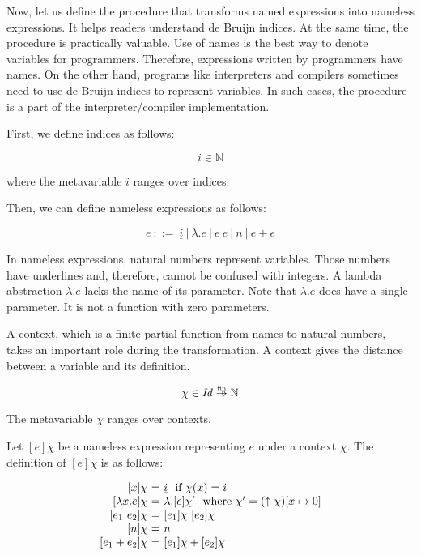 Now, let us define the procedure that transforms named expressions into nameless
expressions. It helps readers understand de Bruijn indices. At the same time, the
procedure is practically valuable. Use of names is the best way to denote
variables for programmers. Therefore, expressions written by programmers have
names. On the other hand, programs like interpreters and compilers sometimes need
to use de Bruijn indices to represent variables. In such cases, the procedure is
a part of the interpreter/compiler implementation.

First, we define indices as follows:

\[ i \in \mathbb{N} \]

where the metavariable $i$ ranges over indices.

Then, we can define nameless expressions as follows:

\[
e\ ::= \ \underline{i}
\ |\ \lambda.e
\ |\ e\ e
\ |\ n
\ |\ e+e
\]

In nameless expressions, natural numbers represent variables. Those numbers have
underlines and, therefore, cannot be confused with integers. A lambda
abstraction $\lambda.e$ lacks the name of its parameter. Note that
$\lambda.e$ does have a single parameter. It is not a function with zero
parameters.

A context, which is a finite partial function from names to natural
numbers, takes an important role during the transformation. A context gives the
distance between a variable and its definition.

\[\chi\in\embox{Id}\finto\mathbb{N}\]

The metavariable $\chi$ ranges over contexts.

Let $[e]\chi$ be a nameless expression representing $e$ under a context $\chi$.
The definition of $[e]\chi$ is as follows:

\[
  \begin{array}{r@{~}c@{~}l}
  \lbrack x\rbrack \chi &=& \underline{i}\ \ \text{if}\ \chi(x)=i \\
  \lbrack \lambda x.e\rbrack \chi &=& \lambda.\lbrack e\rbrack {\chi'}\ \ \text{where}\
  \chi'=(\uparrow\chi)\lbrack x\mapsto 0\rbrack  \\
  \lbrack e_1\ e_2\rbrack \chi &=& \lbrack e_1\rbrack \chi\ \lbrack e_2\rbrack \chi \\
  \lbrack n\rbrack \chi &=& n \\
  \lbrack e_1+e_2\rbrack \chi &=& \lbrack e_1\rbrack \chi+\lbrack e_2\rbrack \chi \\
  \end{array}
\]

